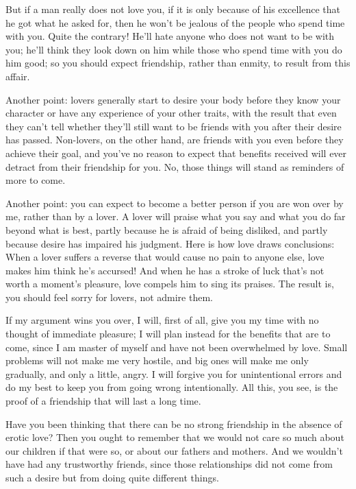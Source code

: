 But if a man really does not love you, if it is only because of his
excellence that he got what he asked for, then he won’t be jealous of
the people who spend time with you. Quite the contrary! He’ll hate
anyone who does not want to be with you; he’ll think they look down on
him while those who spend time with you do him good; so you
should expect friendship, rather than enmity, to result from this
affair.

Another point: lovers generally start to desire your body before they
know your character or have any experience of your other traits, with
the result that even they can’t tell whether they’ll still want to be
friends with you after their desire has passed.
Non-lovers, on the other hand, are friends with you even before they
achieve their goal, and you’ve no reason to expect that benefits
received will ever detract from their friendship for you. No, those
things will stand as reminders of more to come.

Another point: you can expect to become a better person if you are won
over by me, rather than by a lover. A lover will praise what you say and
what you do far beyond what is best, partly because he is afraid of 
being disliked, and partly because desire has impaired his
judgment. Here is how love draws conclusions: When a lover suffers a
reverse that would cause no pain to anyone else, love makes him think
he’s accursed! And when he has a stroke of luck that’s not worth a
moment’s pleasure, love compels him to sing its praises. The result is,
you should feel sorry for lovers, not admire them.

If my argument wins you over, I will, first of all, give you my time
with no thought of immediate pleasure; I will plan instead for the
benefits that are to come, since I am master of myself and have
not been overwhelmed by love. Small problems will not make me very
hostile, and big ones will make me only gradually, and only a little,
angry. I will forgive you for unintentional errors and do my best to
keep you from going wrong intentionally. All this, you see, is the proof
of a friendship that will last a long time.

Have you been thinking that there can be no strong friendship in the
absence of erotic love? Then you ought to remember that we would not 
care so much about our children if that were so, or about our
fathers and mothers. And we wouldn’t have had any trustworthy friends,
since those relationships did not come from such a desire but from doing
quite different things.


